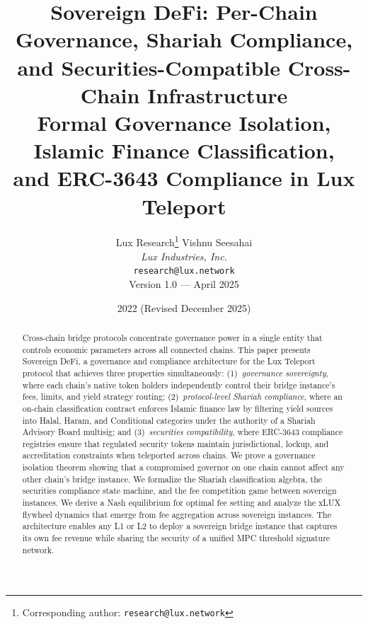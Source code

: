 \documentclass[11pt,twocolumn]{article}
\title{
  \textbf{Sovereign DeFi: Per-Chain Governance, Shariah Compliance,\\
  and Securities-Compatible Cross-Chain Infrastructure} \\[6pt]
  \large Formal Governance Isolation, Islamic Finance Classification,\\
  and ERC-3643 Compliance in Lux Teleport
}
\author{
  Lux Research\thanks{Corresponding author: \texttt{research@lux.network}} \quad
  Vishnu Seesahai \\
  \textit{Lux Industries, Inc.} \\
  \texttt{research@lux.network} \\[4pt]
  \small Version 1.0 --- April 2025
}
\date{2022 (Revised December 2025)}
\theoremstyle{definition}
\begin{document}
\luxcoverpage
\maketitle

\begin{abstract}
Cross-chain bridge protocols concentrate governance power in a single entity that controls economic parameters across all connected chains. This paper presents Sovereign DeFi, a governance and compliance architecture for the Lux Teleport protocol that achieves three properties simultaneously: (1)~\emph{governance sovereignty}, where each chain's native token holders independently control their bridge instance's fees, limits, and yield strategy routing; (2)~\emph{protocol-level Shariah compliance}, where an on-chain classification contract enforces Islamic finance law by filtering yield sources into Halal, Haram, and Conditional categories under the authority of a Shariah Advisory Board multisig; and (3)~\emph{securities compatibility}, where ERC-3643 compliance registries ensure that regulated security tokens maintain jurisdictional, lockup, and accreditation constraints when teleported across chains. We prove a governance isolation theorem showing that a compromised governor on one chain cannot affect any other chain's bridge instance. We formalize the Shariah classification algebra, the securities compliance state machine, and the fee competition game between sovereign instances. We derive a Nash equilibrium for optimal fee setting and analyze the xLUX flywheel dynamics that emerge from fee aggregation across sovereign instances. The architecture enables any L1 or L2 to deploy a sovereign bridge instance that captures its own fee revenue while sharing the security of a unified MPC threshold signature network.
\end{abstract}













\end{document}
